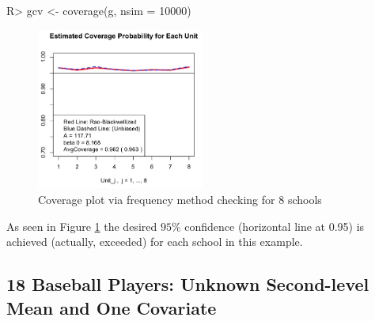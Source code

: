 \documentclass[article]{jss}
\begin{document}
\begin{CodeChunk}
\begin{CodeInput}
R> gcv <- coverage(g, nsim = 10000)
\end{CodeInput}
\end{CodeChunk}
\begin{figure}[h] 
\begin{center}
\includegraphics[width = 5.5cm]{school2.png}
\caption{Coverage plot via frequency method checking for 8 schools}
\label{fig:schoolcoverage}
\end{center}
\end{figure}

As seen in Figure \ref{fig:schoolcoverage} the desired $95\%$ confidence (horizontal line at 0.95) is achieved (actually, exceeded) for each school in this example. 




\subsection[Unknown Second-level Mean and One Covariate]{18 Baseball Players: Unknown Second-level Mean and One Covariate}
\end{document}
